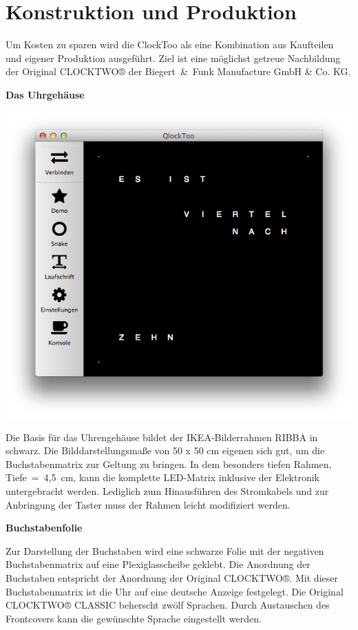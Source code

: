 
\section{Konstruktion und Produktion}
\label{sec:KonstruktionFertigung}

\begin{multicols}{2}
Um Kosten zu sparen wird die ClockToo als eine Kombination aus Kaufteilen und eigener Produktion ausgeführt. Ziel ist eine möglichst getreue Nachbildung der Original CLOCKTWO® der Biegert~\&~Funk Manufacture GmbH \& Co. KG. 

\textbf{Das Uhrgehäuse}

\includegraphics[width=0.9\columnwidth]{Abbildungen/Software/Manager} %

Die Basis für das Uhrengehäuse bildet der IKEA-Bilderrahmen RIBBA in schwarz. Die Bilddarstellungsmaße von 50 x 50 cm eigenen sich gut, um die Buchstabenmatrix zur Geltung zu bringen. In dem besonders tiefen Rahmen,  Tiefe~=~4,5~cm, kann die komplette LED-Matrix inklusive der Elektronik untergebracht werden. Lediglich zum Hinausführen des Stromkabels und zur Anbringung der Taster muss der Rahmen leicht modifiziert werden. 

\textbf{Buchstabenfolie}

Zur Darstellung der Buchstaben wird eine schwarze Folie mit der negativen Buchstabenmatrix auf eine Plexiglasscheibe geklebt. Die Anordnung der Buchstaben entspricht der Anordnung der Original CLOCKTWO®. Mit dieser Buchstabenmatrix ist die Uhr auf eine deutsche Anzeige festgelegt. Die Original CLOCKTWO® CLASSIC beherscht zwölf Sprachen. Durch Austauschen des Frontcovers kann die gewünschte Sprache eingestellt werden. 


\end{multicols}
